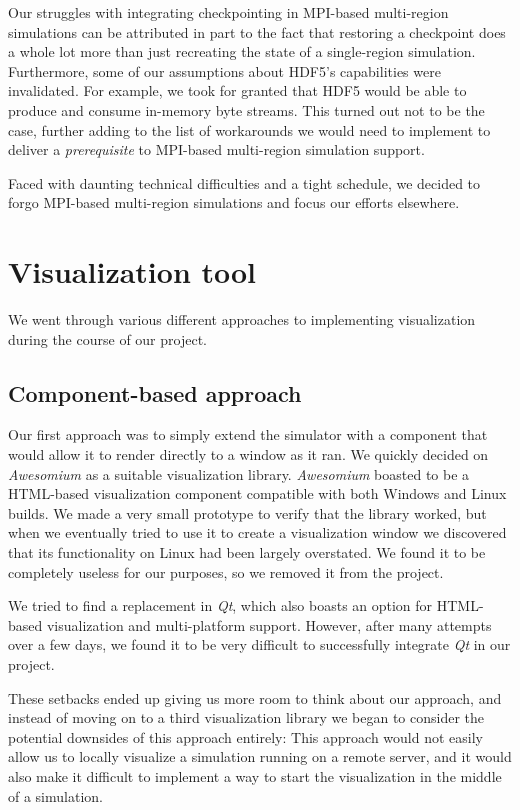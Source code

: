 \documentclass[a4paper,12pt]{article}
\begin{document}
Our struggles with integrating checkpointing in MPI-based multi-region simulations can be attributed in part to the fact that restoring a checkpoint does a whole lot more than just recreating the state of a single-region simulation. Furthermore, some of our assumptions about HDF5's capabilities were invalidated. For example, we took for granted that HDF5 would be able to produce and consume in-memory byte streams. This turned out not to be the case, further adding to the list of workarounds we would need to implement to deliver a \emph{prerequisite} to MPI-based multi-region simulation support.

Faced with daunting technical difficulties and a tight schedule, we decided to forgo MPI-based multi-region simulations and focus our efforts elsewhere.

\section{Visualization tool}
We went through various different approaches to implementing visualization during the course of our project.

\subsection{Component-based approach}
Our first approach was to simply extend the simulator with a component that would allow it to render directly to a window as it ran. We quickly decided on \textit{Awesomium} as a suitable visualization library. \textit{Awesomium} boasted to be a HTML-based visualization component compatible with both Windows and Linux builds. We made a very small prototype to verify that the library worked, but when we eventually tried to use it to create a visualization window we discovered that its functionality on Linux had been largely overstated. We found it to be completely useless for our purposes, so we removed it from the project.

We tried to find a replacement in \textit{Qt}, which also boasts an option for HTML-based visualization and multi-platform support. However, after many attempts over a few days, we found it to be very difficult to successfully integrate \textit{Qt} in our project.

These setbacks ended up giving us more room to think about our approach, and instead of moving on to a third visualization library we began to consider the potential downsides of this approach entirely: This approach would not easily allow us to locally visualize a simulation running on a remote server, and it would also make it difficult to implement a way to start the visualization in the middle of a simulation.
\end{document}
